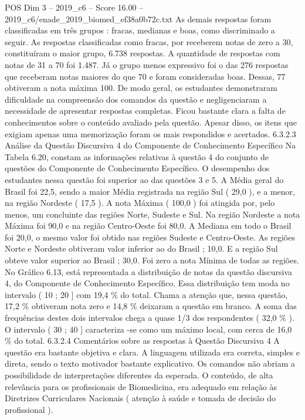 \begin{textsample}{POS Dim 3 – 2019\_c6 – Score 16.00 – 2019\_c6/enade\_2019\_biomed\_ef38a0b72c.txt}
As demais respostas foram classificadas em três grupos : fracas, medianas e boas, como discriminado a seguir.
As respostas classificadas como fracas, por receberem notas de zero a 30, constituíram o maior grupo, 6.738 respostas.
A quantidade de respostas com notas de 31 a 70 foi 1.487.
Já o grupo menos expressivo foi o das 276 respostas que receberam notas maiores do que 70 e foram consideradas boas.
Dessas, 77 obtiveram a nota máxima 100.
De modo geral, os estudantes demonstraram dificuldade na compreensão dos comandos da questão e negligenciaram a necessidade de apresentar respostas completas.
Ficou bastante clara a falta de conhecimentos sobre o conteúdo avaliado pela questão.
Apesar disso, os itens que exigiam apenas uma memorização foram os mais respondidos e acertados. 6.3.2.3 Análise da Questão Discursiva 4 do Componente de Conhecimento Específico Na Tabela 6.20, constam as informações relativas à questão 4 do conjunto de questões do Componente de Conhecimento Específico.
O desempenho dos estudantes nessa questão foi superior ao das questões 3 e 5.
A Média geral do Brasil foi 22,5, sendo a maior Média registrada na região Sul ( 29,0 ), e a menor, na região Nordeste ( 17,5 ).
A nota Máxima ( 100,0 ) foi atingida por, pelo menos, um concluinte das regiões Norte, Sudeste e Sul.
Na região Nordeste a nota Máxima foi 90,0 e na região Centro-Oeste foi 80,0.
A Mediana em todo o Brasil foi 20,0, o mesmo valor foi obtido nas regiões Sudeste e Centro-Oeste.
As regiões Norte e Nordeste obtiveram valor inferior ao do Brasil ; 10,0.
E a região Sul obteve valor superior ao Brasil ; 30,0.
Foi zero a nota Mínima de todas as regiões.
No Gráfico 6.13, está representada a distribuição de notas da questão discursiva 4, do Componente de Conhecimento Específico.
Essa distribuição tem moda no intervalo ( 10 ; 20 ] com 19,4 \% do total.
Chama a atenção que, nessa questão, 17,2 \% obtiveram nota zero e 14,8 \% deixaram a questão em branco.
A soma das frequências destes dois intervalos chega a quase 1/3 dos respondentes ( 32,0 \% ).
O intervalo ( 30 ; 40 ] caracteriza -se como um máximo local, com cerca de 16,0 \% do total. 6.3.2.4 Comentários sobre as respostas à Questão Discursiva 4 A questão era bastante objetiva e clara.
A linguagem utilizada era correta, simples e direta, sendo o texto motivador bastante explicativo.
Os comandos não abriam a possibilidade de interpretações diferentes da esperada.
O conteúdo, de alta relevância para os profissionais de Biomedicina, era adequado em relação às Diretrizes Curriculares Nacionais ( atenção à saúde e tomada de decisão do profissional ).

\end{textsample}
